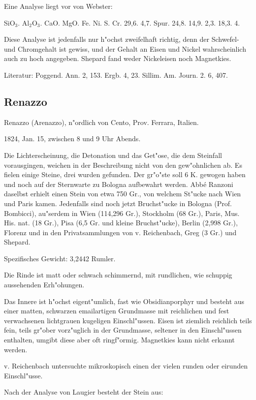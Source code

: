 \documentclass[a4paper, 11pt, oneside]{article}
\begin{document}
Eine Analyse liegt vor von Webster:

SiO$_{3}$. Al$_{2}$O$_{3}$. CaO. MgO. Fe. Ni. S. Cr.  
29,6. 4,7. Spur. 24,8. 14,9. 2,3. 18,3. 4.

Diese Analyse ist jedenfalls nur h"ochst zweifelhaft richtig, denn der Schwefel- und Chromgehalt ist gewiss, und der Gehalt an Eisen und Nickel wahrscheinlich auch zu hoch angegeben. Shepard fand weder Nickeleisen noch Magnetkies.

Literatur: Poggend. Ann. 2, 153. Ergb. 4, 23. Sillim. Am. Journ. 2. 6, 407.

\subsection{Renazzo}

Renazzo (Arenazzo), n"ordlich von Cento, Prov. Ferrara, Italien.

1824, Jan. 15, zwischen 8 und 9 Uhr Abends.

Die Lichterscheinung, die Detonation und das Get"ose, die dem Steinfall vorausgingen, weichen in der Beschreibung nicht von den gew"ohnlichen ab. Es fielen einige Steine, drei wurden gefunden. Der gr"o"ste soll 6 K. gewogen haben und noch auf der Sternwarte zu Bologna aufbewahrt werden. Abbé Ranzoni daselbst erhielt einen Stein von etwa 750 Gr., von welchem St"ucke nach Wien und Paris kamen. Jedenfalls sind noch jetzt Bruchst"ucke in Bologna (Prof. Bombicci), au"serdem in Wien (114,296 Gr.), Stockholm (68 Gr.), Paris, Mus. His. nat. (18 Gr.), Pisa (6,5 Gr. und kleine Bruchst"ucke), Berlin (2,998 Gr.), Florenz und in den Privatsammlungen von v. Reichenbach, Greg (3 Gr.) und Shepard.

Spezifisches Gewicht: 3,2442 Rumler.

Die Rinde ist matt oder schwach schimmernd, mit rundlichen, wie schuppig aussehenden Erh"ohungen.

Das Innere ist h"ochst eigent"umlich, fast wie Obsidianporphyr und besteht aus einer matten, schwarzen emailartigen Grundmasse mit reichlichen und fest verwachsenen lichtgrauen kugeligen Einschl"ussen. Eisen ist ziemlich reichlich teils fein, teils gr"ober vorz"uglich in der Grundmasse, seltener in den Einschl"ussen enthalten, umgibt diese aber oft ringf"ormig. Magnetkies kann nicht erkannt werden.

v. Reichenbach untersuchte mikroskopisch einen der vielen runden oder eirunden Einschl"usse.

Nach der Analyse von Laugier besteht der Stein aus:
\end{document}
